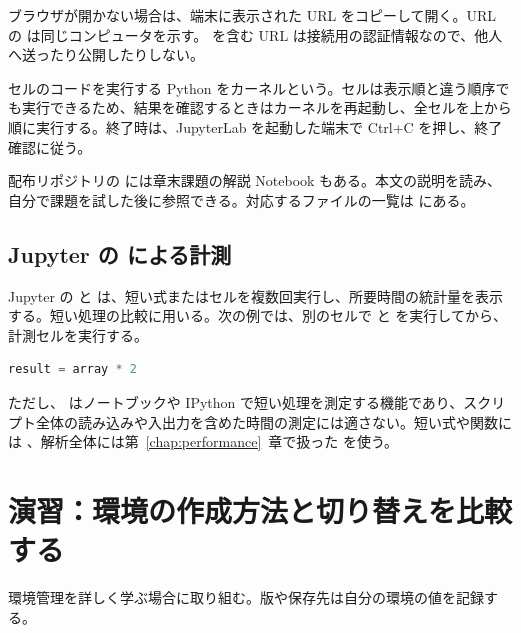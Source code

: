 ブラウザが開かない場合は、端末に表示された URL をコピーして開く。URL の  は同じコンピュータを示す。 を含む URL は接続用の認証情報なので、他人へ送ったり公開したりしない。

セルのコードを実行する Python をカーネルという。セルは表示順と違う順序でも実行できるため、結果を確認するときはカーネルを再起動し、全セルを上から順に実行する。終了時は、JupyterLab を起動した端末で Ctrl+C を押し、終了確認に従う。

配布リポジトリの  には章末課題の解説 Notebook もある。本文の説明を読み、自分で課題を試した後に参照できる。対応するファイルの一覧は  にある。

\subsection{Jupyter の  による計測}

Jupyter の  と  は、短い式またはセルを複数回実行し、所要時間の統計量を表示する。短い処理の比較に用いる。次の例では、別のセルで  と  を実行してから、計測セルを実行する。

\begin{lstlisting}[language=Python]
%%timeit
result = array * 2
\end{lstlisting}

ただし、 はノートブックや IPython で短い処理を測定する機能であり、スクリプト全体の読み込みや入出力を含めた時間の測定には適さない。短い式や関数には 、解析全体には第~\ref{chap:performance}~章で扱った  を使う。

\section{演習：環境の作成方法と切り替えを比較する}

環境管理を詳しく学ぶ場合に取り組む。版や保存先は自分の環境の値を記録する。

